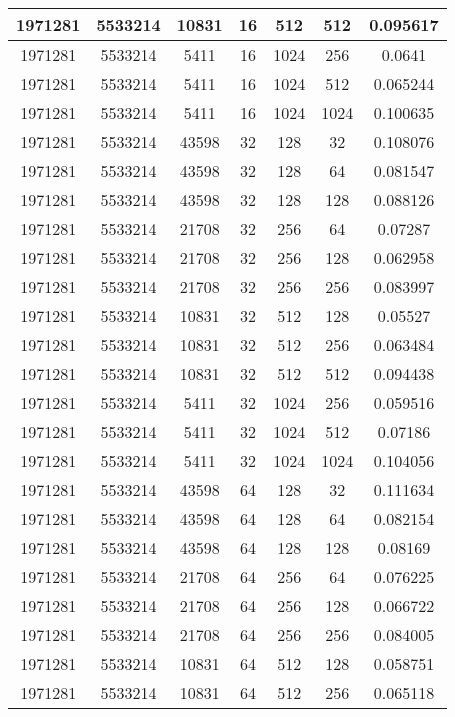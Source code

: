 \documentclass[9pt]{article}
\begin{document}
\begin{tabular}{|c|c|c|c|c|c|c| }
\hline
1971281  & 5533214  & 10831  & 16  & 512  & 512  & 0.095617 \\
\hline
1971281  & 5533214  & 5411  & 16  & 1024  & 256  & 0.0641 \\
\hline
1971281  & 5533214  & 5411  & 16  & 1024  & 512  & 0.065244 \\
\hline
1971281  & 5533214  & 5411  & 16  & 1024  & 1024  & 0.100635 \\
\hline
1971281  & 5533214  & 43598  & 32  & 128  & 32  & 0.108076 \\
\hline
1971281  & 5533214  & 43598  & 32  & 128  & 64  & 0.081547 \\
\hline
1971281  & 5533214  & 43598  & 32  & 128  & 128  & 0.088126 \\
\hline
1971281  & 5533214  & 21708  & 32  & 256  & 64  & 0.07287 \\
\hline
1971281  & 5533214  & 21708  & 32  & 256  & 128  & 0.062958 \\
\hline
1971281  & 5533214  & 21708  & 32  & 256  & 256  & 0.083997 \\
\hline
1971281  & 5533214  & 10831  & 32  & 512  & 128  & 0.05527 \\
\hline
1971281  & 5533214  & 10831  & 32  & 512  & 256  & 0.063484 \\
\hline
1971281  & 5533214  & 10831  & 32  & 512  & 512  & 0.094438 \\
\hline
1971281  & 5533214  & 5411  & 32  & 1024  & 256  & 0.059516 \\
\hline
1971281  & 5533214  & 5411  & 32  & 1024  & 512  & 0.07186 \\
\hline
1971281  & 5533214  & 5411  & 32  & 1024  & 1024  & 0.104056 \\
\hline
1971281  & 5533214  & 43598  & 64  & 128  & 32  & 0.111634 \\
\hline
1971281  & 5533214  & 43598  & 64  & 128  & 64  & 0.082154 \\
\hline
1971281  & 5533214  & 43598  & 64  & 128  & 128  & 0.08169 \\
\hline
1971281  & 5533214  & 21708  & 64  & 256  & 64  & 0.076225 \\
\hline
1971281  & 5533214  & 21708  & 64  & 256  & 128  & 0.066722 \\
\hline
1971281  & 5533214  & 21708  & 64  & 256  & 256  & 0.084005 \\
\hline
1971281  & 5533214  & 10831  & 64  & 512  & 128  & 0.058751 \\
\hline
1971281  & 5533214  & 10831  & 64  & 512  & 256  & 0.065118 \\

\end{tabular}
\end{document}
